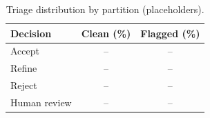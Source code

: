 \begin{table}[h]
\centering
\caption{Triage distribution by partition (placeholders).}
\label{tab:partition_triage}
\begin{tabular}{lcc}
\toprule
\textbf{Decision} & \textbf{Clean (\%)} & \textbf{Flagged (\%)} \\
\midrule
Accept       & -- & -- \\
Refine       & -- & -- \\
Reject       & -- & -- \\
Human review & -- & -- \\
\bottomrule
\end{tabular}
\end{table}

